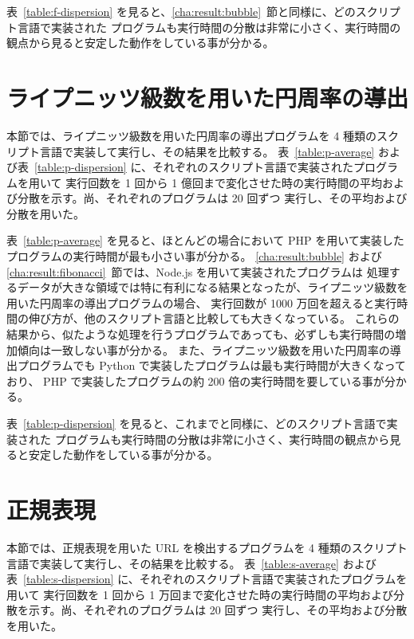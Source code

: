 表~\ref{table:f-dispersion} を見ると、\ref{cha:result:bubble}~節と同様に、どのスクリプト言語で実装された
プログラムも実行時間の分散は非常に小さく、実行時間の観点から見ると安定した動作をしている事が分かる。

\section{ライプニッツ級数を用いた円周率の導出}
\label{cha:result:leibniz}

本節では、ライプニッツ級数を用いた円周率の導出プログラムを 4 種類のスクリプト言語で実装して実行し、その結果を比較する。
表~\ref{table:p-average} および表~\ref{table:p-dispersion} に、それぞれのスクリプト言語で実装されたプログラムを用いて
実行回数を 1 回から 1 億回まで変化させた時の実行時間の平均および分散を示す。尚、それぞれのプログラムは 20 回ずつ
実行し、その平均および分散を用いた。

表~\ref{table:p-average} を見ると、ほとんどの場合において PHP を用いて実装したプログラムの実行時間が最も小さい事が分かる。
\ref{cha:result:bubble} および \ref{cha:result:fibonacci}~節では、Node.js を用いて実装されたプログラムは
処理するデータが大きな領域では特に有利になる結果となったが、ライプニッツ級数を用いた円周率の導出プログラムの場合、
実行回数が 1000 万回を超えると実行時間の伸び方が、他のスクリプト言語と比較しても大きくなっている。
これらの結果から、似たような処理を行うプログラムであっても、必ずしも実行時間の増加傾向は一致しない事が分かる。
また、ライプニッツ級数を用いた円周率の導出プログラムでも Python で実装したプログラムは最も実行時間が大きくなっており、
PHP で実装したプログラムの約 200 倍の実行時間を要している事が分かる。

表~\ref{table:p-dispersion} を見ると、これまでと同様に、どのスクリプト言語で実装された
プログラムも実行時間の分散は非常に小さく、実行時間の観点から見ると安定した動作をしている事が分かる。

\section{正規表現}
\label{cha:result:regex}

本節では、正規表現を用いた URL を検出するプログラムを 4 種類のスクリプト言語で実装して実行し、その結果を比較する。
表~\ref{table:s-average} および表~\ref{table:s-dispersion} に、それぞれのスクリプト言語で実装されたプログラムを用いて
実行回数を 1 回から 1 万回まで変化させた時の実行時間の平均および分散を示す。尚、それぞれのプログラムは 20 回ずつ
実行し、その平均および分散を用いた。

